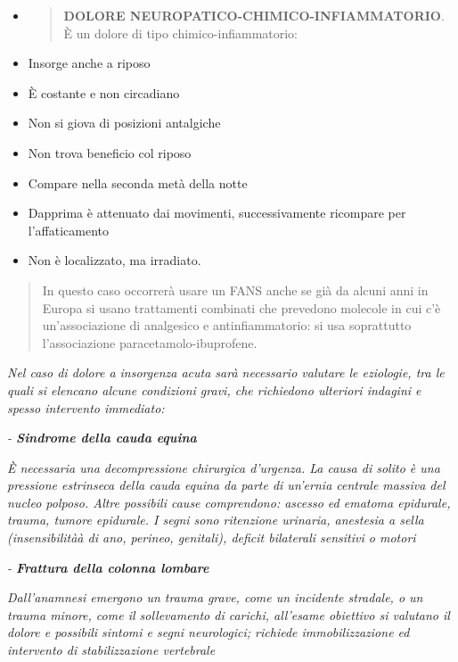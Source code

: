 \documentclass[]{article}
\begin{document}
\begin{itemize}
\item
  \begin{quote}
  \textbf{DOLORE NEUROPATICO-CHIMICO-INFIAMMATORIO}. È un dolore di tipo
  chimico-infiammatorio:
  \end{quote}
\end{itemize}

\begin{itemize}
\item
  Insorge anche a riposo
\item
  È costante e non circadiano
\item
  Non si giova di posizioni antalgiche
\item
  Non trova beneficio col riposo
\item
  Compare nella seconda metà della notte
\item
  Dapprima è attenuato dai movimenti, successivamente ricompare per
  l'affaticamento
\item
  Non è localizzato, ma irradiato.
\end{itemize}

\begin{quote}
In questo caso occorrerà usare un FANS anche se già da alcuni anni in
Europa si usano trattamenti combinati che prevedono molecole in cui c'è
un'associazione di analgesico e antinfiammatorio: si usa soprattutto
l'associazione paracetamolo-ibuprofene.
\end{quote}

\emph{Nel caso di \emph{dolore a insorgenza acuta} sarà necessario
valutare le eziologie, tra le quali si elencano alcune condizioni gravi,
che richiedono ulteriori indagini e spesso intervento immediato: }

\emph{- \textbf{Sindrome della cauda equina }}

\emph{È necessaria una decompressione chirurgica d'urgenza. La causa di
solito è una pressione estrinseca della cauda equina da parte di
un'ernia centrale massiva del nucleo polposo. Altre possibili cause
comprendono: ascesso ed ematoma epidurale, trauma, tumore epidurale. I
segni sono ritenzione urinaria, anestesia a sella (insensibilitàà di
ano, perineo, genitali), deficit bilaterali sensitivi o motori }

\emph{- \textbf{Frattura della colonna lombare }}

\emph{Dall'anamnesi emergono un trauma grave, come un incidente
stradale, o un trauma minore, come il sollevamento di carichi, all'esame
obiettivo si valutano il dolore e possibili sintomi e segni neurologici;
richiede immobilizzazione ed intervento di stabilizzazione vertebrale }
\end{document}
